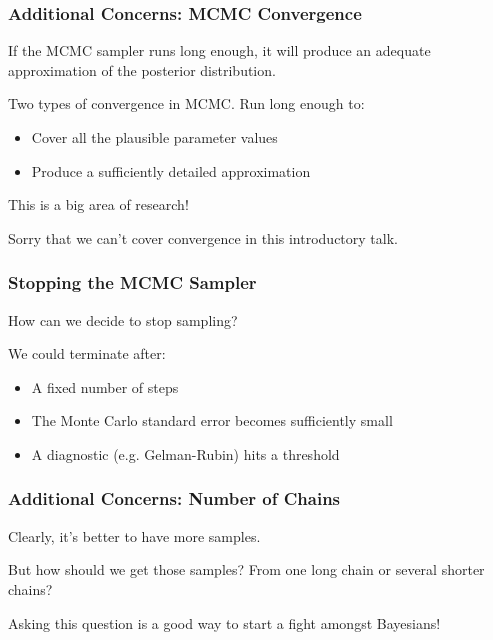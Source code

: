 \documentclass{beamer}
\begin{document}
\begin{frame}
\frametitle{ Additional Concerns:  MCMC  Convergence      }
If the MCMC sampler runs long enough, it will produce an adequate approximation of the posterior distribution.\\

\vspace{.75cm}

Two types of convergence in MCMC. Run long enough to:
\begin{itemize}
\item Cover all the plausible parameter values
\item Produce a sufficiently detailed approximation
\end{itemize}

\vspace{.5cm}

This is a big area of research!\\

\vspace{.5cm}

 Sorry that we can't cover convergence in this introductory talk. 

\end{frame}

\begin{frame}
 \frametitle{ Stopping the  MCMC  Sampler    }

How can we decide to stop sampling? \\

\vspace{.5cm}

 We could terminate after:

\begin{itemize}
\item A fixed number of steps
\item The Monte Carlo standard error becomes sufficiently small
\item A diagnostic (e.g. Gelman-Rubin) hits a threshold

\end{itemize}

\end{frame}



\begin{frame}
\frametitle{ Additional Concerns:  Number of Chains      }
Clearly, it's better to have more samples. \\

\vspace{.5cm}

But how should we get those samples? From one long chain or several shorter chains? \\

\vspace{.5cm}

Asking this question is a good way to start a fight amongst Bayesians!
\end{frame}
\end{document}
